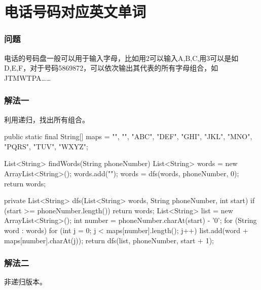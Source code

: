 \section{电话号码对应英文单词} %
\label{sec:phone-number}


\subsubsection{问题}
电话的号码盘一般可以用于输入字母，比如用2可以输入A,B,C,用3可以是如D,E,F，对于号码5869872，可以依次输出其代表的所有字母组合，如JTMWTPA……

\subsubsection{解法一}
利用递归，找出所有组合。

\begin{Codex}[label={[$O(3^N)+O(3^N)$]Chap03_02_PhoneNumber.java}]
public static final String[] maps = {"", "", "ABC", "DEF",
									 "GHI", "JKL", "MNO",
		 							 "PQRS", "TUV", "WXYZ"};

List<String> findWords(String phoneNumber) {
	List<String> words = new ArrayList<String>();
	words.add("");
	words = dfs(words, phoneNumber, 0);
	return words;
}

private List<String> dfs(List<String> words, String phoneNumber, int start) {
	if (start >= phoneNumber.length()) {
		return words;
	}
	List<String> list = new ArrayList<String>();
	int number = phoneNumber.charAt(start) - '0';
	for (String word : words) {
		for (int j = 0; j < maps[number].length(); j++) {
			list.add(word + maps[number].charAt(j));
		}
	}
	return dfs(list, phoneNumber, start + 1);
}
\end{Codex}

\subsubsection{解法二}
非递归版本。

